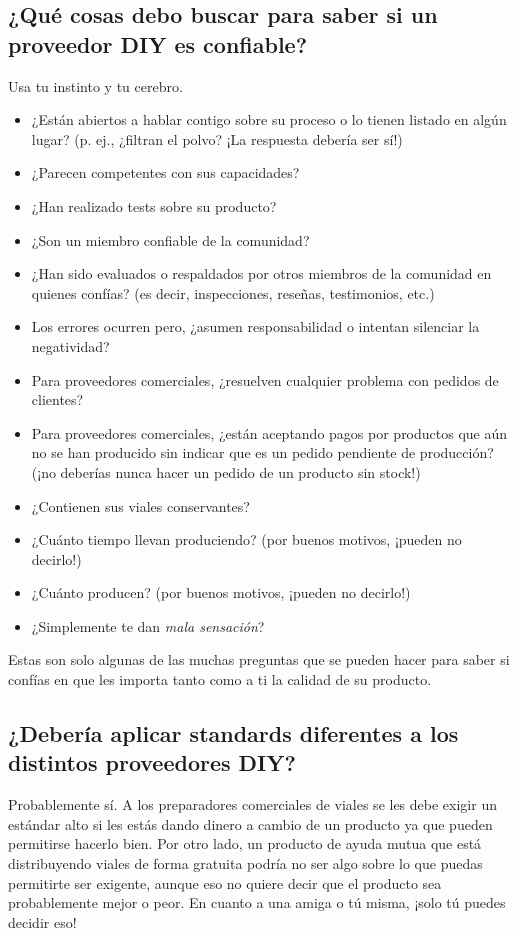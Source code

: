 \documentclass{article}
\begin{document}
\subsection{¿Qué cosas debo buscar para saber si un proveedor DIY es confiable?}

Usa tu instinto y tu cerebro.

\begin{itemize}
  \item ¿Están abiertos a hablar contigo sobre su proceso o lo tienen listado en algún lugar? (p. ej., ¿filtran el polvo? ¡La respuesta debería ser sí!)
  \item ¿Parecen competentes con sus capacidades?
  \item ¿Han realizado tests sobre su producto?
  \item ¿Son un miembro confiable de la comunidad?
  \item ¿Han sido evaluados o respaldados por otros miembros de la comunidad en quienes confías? (es decir, inspecciones, reseñas, testimonios, etc.)
  \item Los errores ocurren pero, ¿asumen responsabilidad o intentan silenciar la negatividad?
  \item Para proveedores comerciales, ¿resuelven cualquier problema con pedidos de clientes?
  \item Para proveedores comerciales, ¿están aceptando pagos por productos que aún no se han producido sin indicar que es un pedido pendiente de producción? (¡no deberías nunca hacer un pedido de un producto sin stock!)
  \item ¿Contienen sus viales conservantes?
  \item ¿Cuánto tiempo llevan produciendo? (por buenos motivos, ¡pueden no decirlo!)
  \item ¿Cuánto producen? (por buenos motivos, ¡pueden no decirlo!)
  \item ¿Simplemente te dan \textit{mala sensación}?
\end{itemize}

Estas son solo algunas de las muchas preguntas que se pueden hacer para saber si confías en que les importa tanto como a ti la calidad de su producto.

\subsection{¿Debería aplicar standards diferentes a los distintos proveedores DIY?}

Probablemente sí. A los preparadores comerciales de viales se les debe exigir un estándar alto si les estás dando dinero a cambio de un producto ya que pueden permitirse hacerlo bien. Por otro lado, un producto de ayuda mutua que está distribuyendo viales de forma gratuita podría no ser algo sobre lo que puedas permitirte ser exigente, aunque eso no quiere decir que el producto sea probablemente mejor o peor. En cuanto a una amiga o tú misma, ¡solo tú puedes decidir eso!
\end{document}
